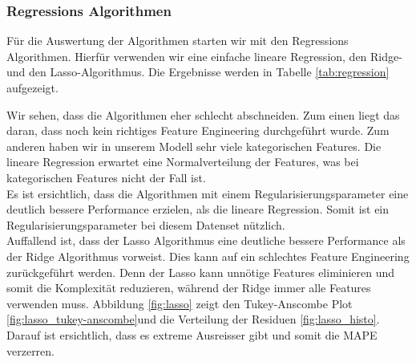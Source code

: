 \subsubsection{Regressions Algorithmen}
Für die Auswertung der Algorithmen starten wir mit den Regressions Algorithmen. Hierfür verwenden wir eine  einfache lineare Regression, den Ridge- und den Lasso-Algorithmus. Die Ergebnisse werden in Tabelle \ref{tab:regression} aufgezeigt.

\begin{table}[h]
\centering
{}
\caption{Ergebnisse der Regression Algorithmen}
\label{tab:regression}
\end{table}

Wir sehen, dass die Algorithmen eher schlecht abschneiden. Zum einen liegt das daran, dass noch kein richtiges Feature Engineering durchgeführt wurde. Zum anderen haben wir in unserem Modell sehr viele kategorischen Features. Die lineare Regression erwartet eine Normalverteilung der Features, was bei kategorischen Features nicht der Fall ist.\\
Es ist ersichtlich, dass die Algorithmen mit einem Regularisierungsparameter eine deutlich bessere Performance erzielen, als die lineare Regression. Somit ist ein Regularisierungsparameter bei diesem Datenset nützlich.\\
Auffallend ist, dass der Lasso Algorithmus eine deutliche bessere Performance als der Ridge Algorithmus vorweist. Dies kann auf ein schlechtes Feature Engineering zurückgeführt werden. Denn der Lasso kann unnötige Features eliminieren und somit die Komplexität reduzieren, während der Ridge immer alle Features verwenden muss. Abbildung \ref{fig:lasso} zeigt den Tukey-Anscombe Plot \ref{fig:lasso_tukey-anscombe}und die Verteilung der Residuen \ref{fig:lasso_histo}. Darauf ist ersichtlich, dass es extreme Ausreisser gibt und somit die MAPE verzerren.

